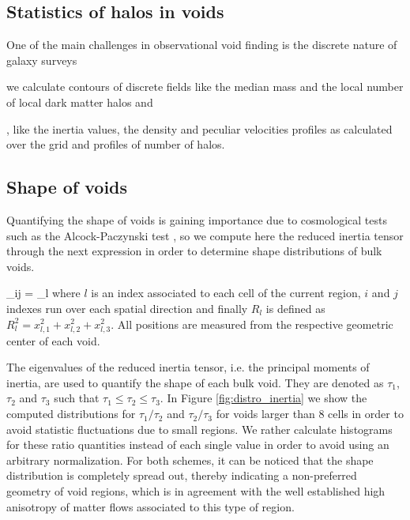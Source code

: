 \documentclass[a4,useAMS,usenatbib,usegraphicx]{latex/mn2e}
\begin{document}
\subsection{Statistics of halos in voids}
\label{subsec:shape_voids}


One of the main challenges in observational void finding is the discrete 
nature of galaxy surveys

 we calculate contours of discrete fields like the median mass and 
the local number of local dark matter halos and

, like the inertia values,
the density and peculiar velocities profiles as calculated over the grid 
and profiles of number of halos.


\subsection{Shape of voids}
\label{subsec:shape_voids}


Quantifying the shape of voids is gaining importance due to cosmological 
tests such as the Alcock-Paczynski test \SRKED{[Sutter et al 2012]}, so 
we compute here the reduced inertia tensor through the next expression in 
order to determine shape distributions of bulk voids.


{ \tau_{ij} = \sum_l  }
where $l$ is an index associated to each cell of the current region, 
$i$ and $j$ indexes run over each spatial direction and finally 
$R_l$ is defined as $R_l^2 = x_{l,1}^2 + x_{l,2}^2 + x_{l,3}^2$. All 
positions are measured from the respective geometric center of each void.


The eigenvalues of the reduced inertia tensor, i.e. the principal moments
of inertia, are used to quantify the shape of each bulk void. They are 
denoted as $\tau_1$, $\tau_2$ and $\tau_3$ such that $\tau_1 \leq \tau_2
\leq \tau_3$. In Figure \ref{fig:distro_inertia} we show the computed
distributions for $\tau_1/\tau_2$ and $\tau_2/\tau_3$ for voids larger 
than 8 cells in order to avoid statistic fluctuations due to small regions.
We rather calculate histograms for these ratio quantities instead of each 
single value in order to avoid using an arbitrary normalization. For both 
schemes, it can be noticed that the shape distribution is completely 
spread out, thereby indicating a non-preferred geometry of void regions, 
which is in agreement with the well established high anisotropy of matter 
flows associated to this type of region. 
\end{document}
